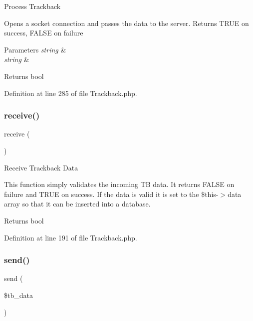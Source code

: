 Process Trackback

Opens a socket connection and passes the data to the server. Returns T\+R\+UE on success, F\+A\+L\+SE on failure


\begin{DoxyParams}{Parameters}
{\em string} & \\
\hline
{\em string} & \\
\hline
\end{DoxyParams}
\begin{DoxyReturn}{Returns}
bool 
\end{DoxyReturn}


Definition at line 285 of file Trackback.\+php.

\mbox{\label{class_c_i___trackback_ac805eb3a4eb25b19c1ab093023da4d35}} 
\subsubsection{\texorpdfstring{receive()}{receive()}}
{\footnotesize\ttfamily receive (\begin{DoxyParamCaption}{ }\end{DoxyParamCaption})}

Receive Trackback Data

This function simply validates the incoming TB data. It returns F\+A\+L\+SE on failure and T\+R\+UE on success. If the data is valid it is set to the \$this-\/$>$data array so that it can be inserted into a database.

\begin{DoxyReturn}{Returns}
bool 
\end{DoxyReturn}


Definition at line 191 of file Trackback.\+php.

\mbox{\label{class_c_i___trackback_a4ee54341ef16e67ca033704f4373a56b}} 
\subsubsection{\texorpdfstring{send()}{send()}}
{\footnotesize\ttfamily send (\begin{DoxyParamCaption}\item[{}]{\$tb\+\_\+data }\end{DoxyParamCaption})}

